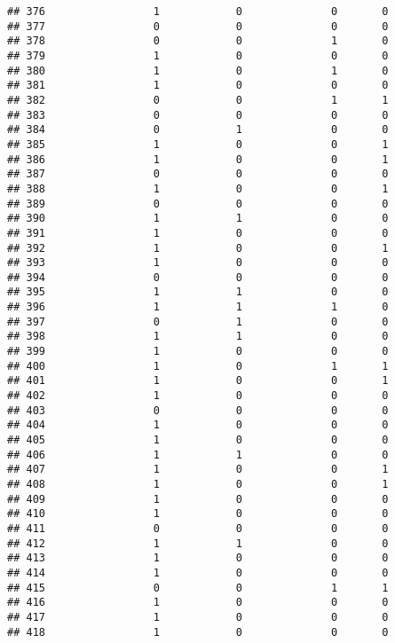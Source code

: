 \documentclass[]{article}
\begin{document}
\begin{verbatim}
## 376                 1            0              0       0
## 377                 0            0              0       0
## 378                 0            0              1       0
## 379                 1            0              0       0
## 380                 1            0              1       0
## 381                 1            0              0       0
## 382                 0            0              1       1
## 383                 0            0              0       0
## 384                 0            1              0       0
## 385                 1            0              0       1
## 386                 1            0              0       1
## 387                 0            0              0       0
## 388                 1            0              0       1
## 389                 0            0              0       0
## 390                 1            1              0       0
## 391                 1            0              0       0
## 392                 1            0              0       1
## 393                 1            0              0       0
## 394                 0            0              0       0
## 395                 1            1              0       0
## 396                 1            1              1       0
## 397                 0            1              0       0
## 398                 1            1              0       0
## 399                 1            0              0       0
## 400                 1            0              1       1
## 401                 1            0              0       1
## 402                 1            0              0       0
## 403                 0            0              0       0
## 404                 1            0              0       0
## 405                 1            0              0       0
## 406                 1            1              0       0
## 407                 1            0              0       1
## 408                 1            0              0       1
## 409                 1            0              0       0
## 410                 1            0              0       0
## 411                 0            0              0       0
## 412                 1            1              0       0
## 413                 1            0              0       0
## 414                 1            0              0       0
## 415                 0            0              1       1
## 416                 1            0              0       0
## 417                 1            0              0       0
## 418                 1            0              0       0

\end{verbatim}
\end{document}

